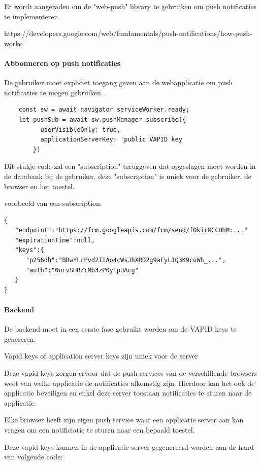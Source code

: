 		Er wordt aangeraden om de "web-push" library te gebruiken om push notificaties te implementeren
		
		https://developers.google.com/web/fundamentals/push-notifications/how-push-works
		
		\paragraph{Abbonneren op push notificaties}
			 De gebruiker moet expliciet toegang geven aan de webapplicatie om push notificaties te mogen gebruiken.
			 
\begin{lstlisting}
    const sw = await navigator.serviceWorker.ready;
    let pushSub = await sw.pushManager.subscribe({
          userVisibleOnly: true,
          applicationServerKey: 'public VAPID key
        })
\end{lstlisting}

			Dit stukje code zal een "subscription" teruggeven dat opgeslagen moet worden in de databank bij de gebruiker. deze "subscription" is uniek voor de gebruiker, de browser en het toestel.
			
			voorbeeld van een subscription:
	
\begin{lstlisting}
{
   "endpoint":"https://fcm.googleapis.com/fcm/send/fOkirMCCHhM:..."
   "expirationTime":null,
   "keys":{
      "p256dh":"BBwYLrPvd2IIAo4cWsJhXRD2g9aFyL1Q3K9cuWh_...",
      "auth":"0orvSHRZrMb3zP0yIpUAcg"
   }
}
\end{lstlisting}


		\paragraph{Backend}
			De backend moet in een eerste fase gebruikt worden om de VAPID keys te genereren.
			
			Vapid keys of application server keys zijn uniek voor de server
			
			Deze vapid keys zorgen ervoor dat de push services van de verschillende browsers weet van welke applicatie de notificaties afkomstig zijn. Hierdoor kan het ook de applicatie beveiligen en enkel deze server toestaan notificaties te sturen naar de applicatie.
			
			Elke browser heeft zijn eigen push service waar een applicatie server aan kan vragen om een notificiatie te sturen naar een bepaald toestel.
			
		
			Deze vapid keys kunnen in de applicatie server gegenereerd worden aan de hand van volgende code:
			
